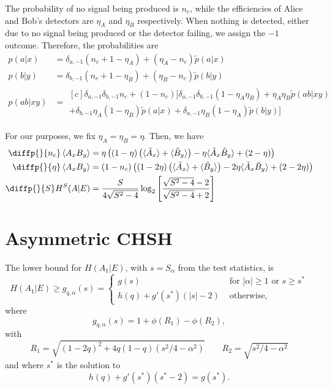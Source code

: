 \documentclass[10pt, a4paper]{article}
\newcommand{\abs}[1]{\left\lvert#1\right\rvert}
\newcommand{\?}{\mathrel{?}} %
\newcommand{\angleb}[1]{\left\langle #1 \right\rangle} %
\numberwithin{equation}{section} %
\theoremstyle{definition}
\theoremstyle{plain}
\theoremstyle{plain}
\begin{document}
    The probability of no signal being produced is \(n_c\), while the efficiencies of Alice and Bob's detectors are \(\eta_A\) and \(\eta_B\) respectively. When nothing is detected, either due to no signal being produced or the detector failing, we assign the \(-1\) outcome. Therefore, the probabilities are
    \begin{align*}
      p(a|x) &= \delta_{a,-1}(n_c + 1 - \eta_A) + (\eta_A - n_c)\tilde{p}(a|x) \\
      p(b|y) &= \delta_{b,-1}(n_c + 1 - \eta_B) + (\eta_B - n_c)\tilde{p}(b|y) \\
      p(ab|xy) &= \begin{aligned}[c] \delta_{a,-1}\delta_{b,-1}n_c + (1-n_c) [ \delta_{a,-1} \delta_{b,-1}(1-\eta_A\eta_B) + \eta_A\eta_B \tilde{p}(ab|xy) \\
        + \delta_{b,-1}\eta_A(1-\eta_B)\tilde{p}(a|x) + \delta_{a,-1}\eta_B(1-\eta_A)\tilde{p}(b|y) ] 
      \end{aligned}
    \end{align*}

    For our purposes, we fix \(\eta_A = \eta_B = \eta\). Then, we have
    \begin{align*}
      \diffp{}{{n_c}} \angleb{A_x B_y} &= \eta \left( \left(1-\eta\right) \left(\langle\tilde{A}_x\rangle + \langle\tilde{B}_y\rangle\right) - \eta \langle\tilde{A}_x\tilde{B}_y\rangle + \left(2 - \eta\right) \right) \\
      \diffp{}{{\eta}} \angleb{A_x B_y} &= \left(1 - n_{c}\right) \left( \left(1-2\eta\right) \left(\langle\tilde{A}_x\rangle+\langle\tilde{B}_y\rangle\right) - 2\eta \langle\tilde{A}_x\tilde{B}_y\rangle + (2-2\eta) \right) \\
      \diffp{}{S} H^S(A|E) &= \frac{S}{4\sqrt{S^2-4}} \log_2 \left[ \frac{\sqrt{S^2-4}-2}{\sqrt{S^2-4}+2} \right]
    \end{align*}


    \section{Asymmetric CHSH}

    The lower bound for \(H(A_1|E)\), with \(s = S_{\alpha}\) from the test statistics, is
    \[ H(A_1|E) \geq g_{q,\alpha}(s) = \begin{cases}
      g(s) & \text{ for } \abs{\alpha} \geq 1 \text{ or } s \geq s^* \\
      h(q) + g'(s^*)(\abs{s}-2) & \text{ otherwise},
    \end{cases}
    \]
    where
    \begin{equation}
      g_{q,\alpha}(s) = 1 + \phi\left(R_1\right) - \phi\left(R_2\right),
    \end{equation}
    with
    \begin{equation} 
      R_1 = \sqrt{{(1-2q)}^2 + 4q(1-q)(s^2/4-\alpha^2)} \qquad R_2 = \sqrt{s^2/4-\alpha^2}
    \end{equation}
    and where \(s^*\) is the solution to
    \begin{equation}
      h(q) + g'(s^*) (s^*-2) = g(s^*).
    \end{equation}
\end{document}
